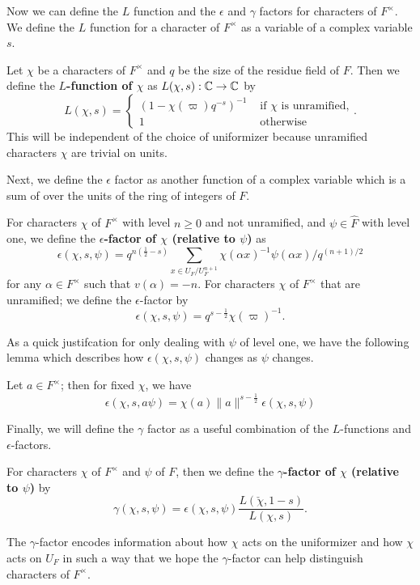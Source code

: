 Now we can define the $L$ function and the  $\epsilon$ and $\gamma$ factors for characters of $F^\times$.
We define the $L$ function for a character of $F^\times$ as a variable of a complex variable $s$.

\begin{defn}
  Let $\chi$ be a characters of $F^\times$ and $q$ be the size of the residue field of $F$. Then we define the \textbf{$L$-function of $\chi$} as $L(\chi, s) : \mathbb{C} \to \mathbb{C}$ by 
  \[L(\chi, s) = \begin{cases} (1 - \chi(\varpi) q^{-s})^{-1} & \text{ if } \chi \text{ is unramified,} \\ 1 & \text{ otherwise} \end{cases}.\]
  This will be independent of the choice of uniformizer because unramified characters $\chi$ are trivial on units.
\end{defn}

Next, we define the $\epsilon$ factor as another function of a complex variable which is a sum of over the units of the ring of integers of $F$.
\begin{defn}
  For characters $\chi$ of $F^\times$ with level $n \geq 0$ and not unramified, and $\psi \in \hat{F}$ with level one, we define the \textbf{$\epsilon$-factor of $\chi$ (relative to $\psi$)} as
  \[\epsilon(\chi, s, \psi) = q^{n(\frac{1}{2} - s)} \sum_{x \in U_F/U_F^{n+1}} \chi(\alpha x)^{-1} \psi(\alpha x)/q^{(n+1)/2}\]
  for any $\alpha \in F^\times$ such that $v(\alpha) = -n$.
  For characters $\chi$ of $F^\times$ that are unramified; we define the $\epsilon$-factor by
  \[\epsilon(\chi, s, \psi) = q^{s - \frac{1}{2}} \chi(\varpi)^{-1}.\]
\end{defn}

As a quick justifcation for only dealing with $\psi$ of level one, we have the following lemma which describes how $\epsilon(\chi, s, \psi)$ changes as $\psi$ changes.
\label{lem:level-one-psi-reduction}
\begin{lemma}
  Let $a \in F^\times$; then for fixed $\chi$, we have
  \[\epsilon ( \chi, s, a \psi) = \chi(a) \| a \|^{s - \frac{1}{2}} \epsilon (\chi, s, \psi)\]
\end{lemma}

Finally, we will define the $\gamma$ factor as a useful combination of the $L$-functions and $\epsilon$-factors.
\begin{defn}
  For characters $\chi$ of $F^\times$ and $\psi$ of $F$, then we define the \textbf{$\gamma$-factor of $\chi$ (relative to $\psi$)} by
  \[\gamma(\chi, s, \psi) = \epsilon(\chi, s, \psi) \frac{L(\check{\chi}, 1-s)}{L(\chi,s)}.\]
\end{defn}
The $\gamma$-factor encodes information about how $\chi$ acts on the uniformizer and how $\chi$ acts on $U_F$ in such a way that we hope the $\gamma$-factor can help distinguish characters of $F^\times$.


